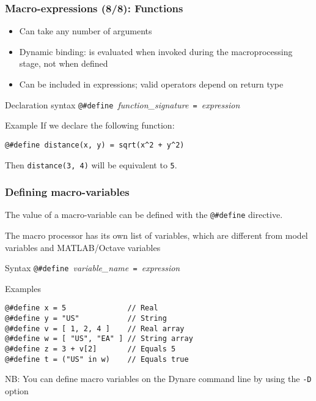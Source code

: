 \documentclass[aspectratio=169]{beamer}
\begin{document}
\begin{frame}[fragile=singleslide]
  \frametitle{Macro-expressions (8/8): Functions}
  \begin{itemize}
  \item Can take any number of arguments
  \item Dynamic binding: is evaluated when invoked during the macroprocessing stage, not when defined
  \item Can be included in expressions; valid operators depend on return type
  \end{itemize}

  \begin{block}{Declaration syntax}
    \verb+@#define +\textit{function\_signature}\verb+ = +\textit{expression}
  \end{block}

  \begin{block}{Example}
If we declare the following function:
\begin{verbatim}
@#define distance(x, y) = sqrt(x^2 + y^2)
\end{verbatim}
Then \texttt{distance(3, 4)} will be equivalent to \texttt{5}.
  \end{block}
\end{frame}

\begin{frame}[fragile=singleslide]
  \frametitle{Defining macro-variables}

  The value of a macro-variable can be defined with the \verb+@#define+
  directive.

  The macro processor has its own list of variables, which are different from model variables and MATLAB/Octave variables

  \begin{block}{Syntax}
    \verb+@#define +\textit{variable\_name}\verb+ = +\textit{expression}
  \end{block}

  \begin{block}{Examples}
\begin{verbatim}
@#define x = 5              // Real
@#define y = "US"           // String
@#define v = [ 1, 2, 4 ]    // Real array
@#define w = [ "US", "EA" ] // String array
@#define z = 3 + v[2]       // Equals 5
@#define t = ("US" in w)    // Equals true
\end{verbatim}
  \end{block}
  NB: You can define macro variables on the Dynare command line by using the \texttt{-D} option
\end{frame}
\end{document}

